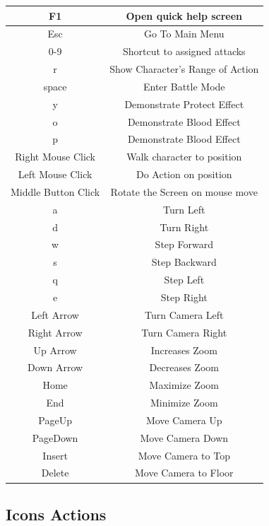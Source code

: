 \documentclass[ letterpaper,12pt]{article}
\begin{document}
\begin{tabular}{|c|c|}
\hline
F1 & Open quick help screen\\
\hline
Esc & Go To Main Menu\\
\hline
0-9 & Shortcut to assigned attacks\\
\hline
r & Show Character's Range of Action\\
\hline
space & Enter Battle Mode\\
\hline
y & Demonstrate Protect Effect\\
o & Demonstrate Blood Effect\\
p & Demonstrate Blood Effect\\
\hline
Right Mouse Click & Walk character to position\\
Left Mouse Click & Do Action on position\\
Middle Button Click & Rotate the Screen on mouse move\\
\hline
a & Turn Left\\
d & Turn Right\\
w & Step Forward\\
s & Step Backward\\
q & Step Left\\
e & Step Right\\
\hline
Left Arrow & Turn Camera Left\\
Right Arrow & Turn Camera Right\\
Up Arrow & Increases Zoom\\
Down Arrow & Decreases Zoom\\
Home & Maximize Zoom\\
End & Minimize Zoom\\
PageUp & Move Camera Up\\
PageDown & Move Camera Down\\
Insert & Move Camera to Top\\
Delete & Move Camera to Floor\\
\hline
\end{tabular}

\subsection{Icons Actions}
\end{document}
